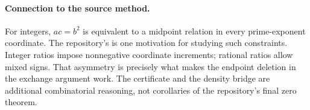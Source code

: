 \paragraph{Connection to the source method.}
For integers, $ac=b^2$ is equivalent to a midpoint relation in every
prime-exponent coordinate. The repository's
is one motivation for studying such constraints. Integer ratios impose
nonnegative coordinate increments; rational ratios allow mixed signs.
That asymmetry is precisely what makes the endpoint deletion in the exchange
argument work. The certificate and the density bridge are additional
combinatorial reasoning, not corollaries of the repository's final zero theorem.
